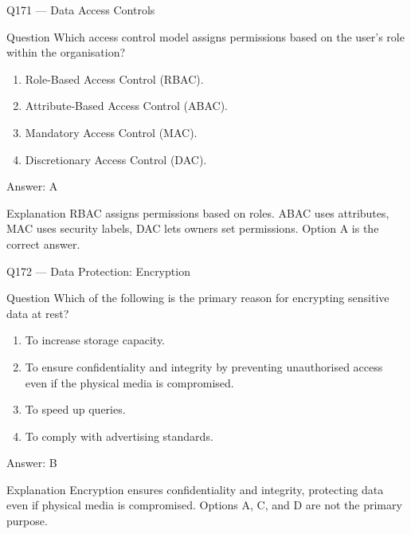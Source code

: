 \documentclass[aspectratio=169,8pt]{beamer}
\begin{document}
\begin{frame}{Q171 --- Data Access Controls}
\begin{block}{Question}
Which access control model assigns permissions based on the user's role within the organisation?
\begin{enumerate}
\item Role-Based Access Control (RBAC).
\item Attribute-Based Access Control (ABAC).
\item Mandatory Access Control (MAC).
\item Discretionary Access Control (DAC).
\end{enumerate}  \end{block}
\begin{exampleblock}{Answer: A}\end{exampleblock}
\begin{block}{Explanation}
RBAC assigns permissions based on roles. ABAC uses attributes, MAC uses security labels, DAC lets owners set permissions. Option A is the correct answer.
\end{block}
\end{frame}

\begin{frame}{Q172 --- Data Protection: Encryption}
\begin{block}{Question}
Which of the following is the primary reason for encrypting sensitive data at rest?
\begin{enumerate}
\item To increase storage capacity.
\item To ensure confidentiality and integrity by preventing unauthorised access even if the physical media is compromised.
\item To speed up queries.
\item To comply with advertising standards.
\end{enumerate}  \end{block}
\begin{exampleblock}{Answer: B}\end{exampleblock}
\begin{block}{Explanation}
Encryption ensures confidentiality and integrity, protecting data even if physical media is compromised. Options A, C, and D are not the primary purpose.
\end{block}
\end{frame}
\end{document}
